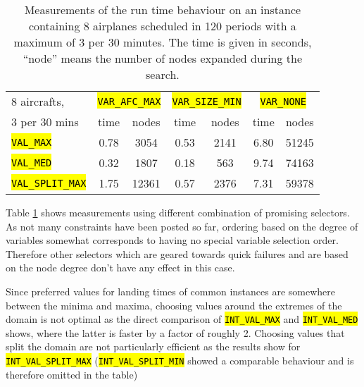 \documentclass[,%
			paper=a4,%
			DIV12,
			liststotoc,
			bibtotoc,
			draft=false,%
			numbers=noendperiod
			]{scrartcl}
\newcommand{\ilc}[1]{\hl{\texttt{#1}}}
\begin{document}
\begin{table}[htbp]
	\centering
	\begin{tabular}{|p{6.5em}|c|c|c|c|c|c|}
	\hline
		 8 aircrafts,
		 & \multicolumn{2}{c|}{\ilc{VAR\_AFC\_MAX}} &
			\multicolumn{2}{c|}{\ilc{VAR\_SIZE\_MIN}}  &
			\multicolumn{2}{c|}{\ilc{VAR\_NONE}}   \\
	 3 per 30 mins&
	 
	 		time & nodes &
	  	time & nodes &
	    time & nodes \\ \hline

		 \ilc{VAL\_MAX}

		 & 0.78 & 3054
		 & 0.53 & 2141
		 & 6.80 & 51245 

		 \\ \hline
		 \ilc{VAL\_MED}

		 & 0.32 & 1807
		 & 0.18 & 563
		 & 9.74 & 74163
	
		 
		 \\ \hline
		 \ilc{VAL\_SPLIT\_MAX}

		 & 1.75 & 12361
		 & 0.57 & 2376
		 & 7.31 & 59378 \\ \hline

	 
\end{tabular}
\caption{Measurements of the run time behaviour on an instance containing 8 airplanes scheduled in 120 periods with a maximum of 3 per 30 minutes. The time is given in seconds, ``node'' means the number of nodes expanded during the search.}
	\label{fig:res1}
\end{table}

Table \ref{fig:res1} shows measurements using different combination of promising selectors.
As not many constraints have been posted so far, ordering based on the degree of variables somewhat corresponds to having no special variable selection order. Therefore other selectors which are geared towards quick failures and are based on the node degree don't have any effect in this case.

Since preferred values for landing times of common instances are somewhere between the minima and maxima, choosing values around the extremes of the domain is not optimal as the direct comparison of \ilc{INT\_VAL\_MAX} and \ilc{INT\_VAL\_MED} shows, where the latter is faster by a factor of roughly 2.
Choosing values that split the domain are not particularly efficient as the results show for \ilc{INT\_VAL\_SPLIT\_MAX} (\ilc{INT\_VAL\_SPLIT\_MIN} showed a comparable behaviour and is therefore omitted in the table)
\end{document}
